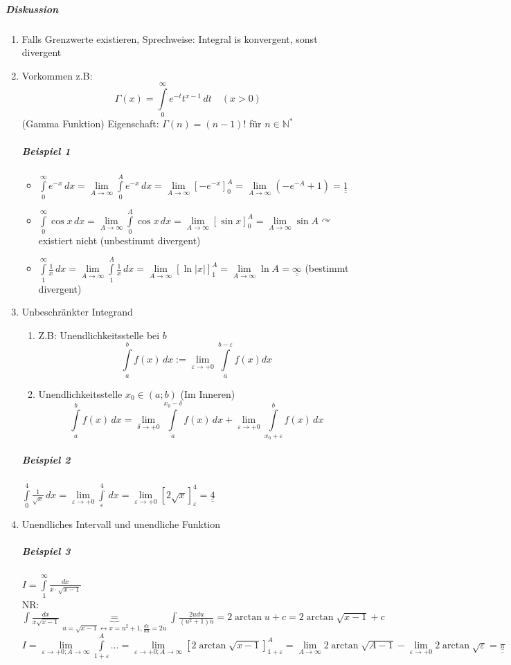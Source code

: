 \documentclass[a4paper]{scrartcl}
\begin{document}
\subparagraph{Diskussion}
\begin{enumerate}
\item Falls Grenzwerte existieren, Sprechweise: Integral is konvergent, sonst divergent
\item Vorkommen z.B: \[\Gamma (x) = \int\limits_0^\infty e^{-t} t^{x-1} \, dt \quad (x > 0)\]
(Gamma Funktion) Eigenschaft: $\Gamma (n) = (n-1)!$ für $n\in \mathbb{N}^*$


\subparagraph{Beispiel 1}
\begin{itemize}
\item $\int\limits_0^\infty e^{-x} \, dx = \lim\limits_{A \to \infty} \int\limits_0^A e^{-x} \, dx = \lim\limits_{A \to \infty} [-e^{-x}]_0^A = \lim\limits_{A \to \infty} (-e^{-A} +1 ) = \underline{\underline{1}}$
\item $\int\limits_0^\infty \cos{x} \, dx = \lim\limits_{A \to \infty} \int\limits_{0}^A \cos{x} \, dx = \lim\limits_{A \to \infty} [\sin{x}]_0^A  = \lim\limits_{A \to \infty} \sin{A} \curvearrowright$ existiert nicht (unbestimmt divergent)
\item $\int\limits_1^\infty \frac{1}{x} \, dx = \lim\limits_{A \to \infty} \int\limits_1^A \frac{1}{x} \, dx = \lim\limits_{A \to \infty} [\ln{\lvert x \rvert}]_1^A = \lim\limits_{A \to \infty} \ln{A} = \underline{\underline{\infty}}$ (bestimmt divergent)
\end{itemize}

\item Unbeschränkter Integrand
\begin{enumerate}
\item Z.B: Unendlichkeitsstelle bei $b$
\[ \int\limits_a^b f(x) \, dx := \lim\limits_{\varepsilon \to + 0} \int\limits_{a}^{b-\varepsilon} f(x) dx\]
\item Unendlichkeitsstelle $x_0 \in (a;b)$ (Im Inneren)
\[ \int\limits_a^b f(x) \, dx = \lim\limits_{\delta \to + 0} \int\limits_{a}^{x_0 - \delta} f(x) \, dx + \lim\limits_{\varepsilon \to +0} \int\limits_{x_0 + \varepsilon}^b f(x) \, dx\]
\end{enumerate}
\subparagraph{Beispiel 2} $\int\limits_0^4 \frac{1}{\sqrt{x}} \, dx = \lim\limits_{\varepsilon \to +0} \int\limits_\varepsilon^4 \, dx = \lim\limits_{\varepsilon \to + 0} [2 \sqrt{x} ]_\varepsilon^4 = \underline{\underline{4}} $

\item Unendliches Intervall und unendliche Funktion
\subparagraph{Beispiel 3} $I = \int\limits_{1}^{\infty} \frac{dx}{x \cdot \sqrt{x-1}}$\\
NR: $\int \frac{dx}{x \sqrt{x-1}} \underbrace{=}_{u = \sqrt{x-1} \leftrightarrow x = u^2 +1, \frac{dx}{du} = 2u} \int \frac{2u du}{(u^2 +1)u} = 2 \arctan{u} +c = 2 \arctan{\sqrt{x-1}} +c$\\
$I = \lim\limits_{\varepsilon \to +0; A \to \infty} \int\limits_{1+\varepsilon}^A \dots = \lim\limits_{\varepsilon \to +0; A \to \infty} [2 \arctan{\sqrt{x-1}}]^A_{1+\varepsilon} = \lim\limits_{A \to \infty} 2 \arctan{\sqrt{A-1}} - \lim\limits_{\varepsilon \to + 0}  2 \arctan{\sqrt{\varepsilon}} = \underline{\underline{\pi}}$
\end{enumerate}
\end{document}
